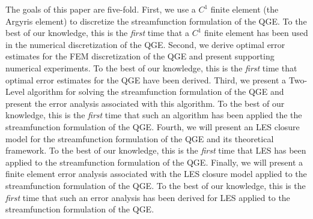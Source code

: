 The goals of this paper are five-fold. First, we use a $C^1$ finite element (the
Argyris element) to discretize the streamfunction formulation of the QGE. To the
best of our knowledge, this is the \emph{first} time that a $C^1$ finite element
has been used in the numerical discretization of the QGE. Second, we derive
optimal error estimates for the FEM discretization of the QGE and present
supporting numerical experiments. To the best of our knowledge, this is the
\emph{first} time that optimal error estimates for the QGE have been derived.
Third, we present a Two-Level algorithm for solving the streamfunction
formulation of the QGE and present the error analysis associated with this
algorithm. To the best of our knowledge, this is the \emph{first} time that such
an algorithm has been applied the the streamfunction formulation of the QGE.
Fourth, we will present an LES closure model for the streamfunction formulation
of the QGE and its theoretical framework. To the best of our knowledge, this is
the \emph{first} time that LES has been applied to the streamfunction
formulation of the QGE. Finally, we will present a finite element error analysis
associated with the LES closure model applied to the streamfunction formulation
of the QGE. To the best of our knowledge, this is the \emph{first} time that
such an error analysis has been derived for LES applied to the streamfunction
formulation of the QGE.

